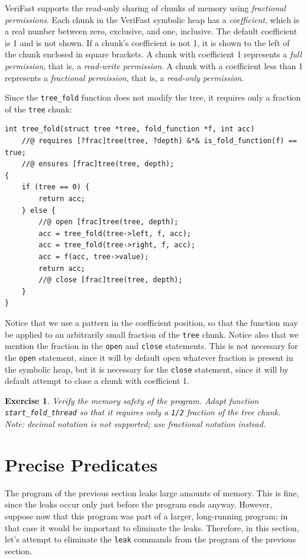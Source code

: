 \documentclass{article}
\newtheorem{exercise}{Exercise}
\begin{document}
VeriFast supports the read-only sharing of chunks of memory
using \emph{fractional permissions}. Each chunk in the VeriFast
symbolic heap has a \emph{coefficient}, which is a real number
between zero, exclusive, and one, inclusive. The default
coefficient is 1 and is not shown. If a chunk's coefficient is
not 1, it is shown to the left of the chunk enclosed in square
brackets. A chunk with coefficient 1 represents a \emph{full
permission}, that is, a \emph{read-write permission}. A chunk
with a coefficient less than 1 represents a \emph{fractional
permission}, that is, a \emph{read-only permission}.

Since the \lstinline!tree_fold! function does not modify the
tree, it requires only a fraction of the \lstinline!tree!
chunk:
\begin{lstlisting}
int tree_fold(struct tree *tree, fold_function *f, int acc)
    //@ requires [?frac]tree(tree, ?depth) &*& is_fold_function(f) == true;
    //@ ensures [frac]tree(tree, depth);
{
    if (tree == 0) {
        return acc;
    } else {
        //@ open [frac]tree(tree, depth);
        acc = tree_fold(tree->left, f, acc);
        acc = tree_fold(tree->right, f, acc);
        acc = f(acc, tree->value);
        return acc;
        //@ close [frac]tree(tree, depth);
    }
}
\end{lstlisting}
Notice that we use a pattern in the coefficient position, so
that the function may be applied to an arbitrarily small
fraction of the \lstinline!tree! chunk. Notice also that we
mention the fraction in the \lstinline!open! and
\lstinline!close! statements. This is not necessary for the
\lstinline!open! statement, since it will by default open
whatever fraction is present in the symbolic heap, but it is
necessary for the \lstinline!close! statement, since it will by
default attempt to close a chunk with coefficient 1.

\begin{exercise}\label{exercise:fractions}
Verify the memory safety of the program. Adapt function
\lstinline!start_fold_thread! so that it requires only a
\lstinline!1/2! fraction of the tree chunk. Note: decimal
notation is not supported; use fractional notation instead.
\end{exercise}

\section{Precise Predicates}\label{section:precise}

The program of the previous section leaks large amounts of
memory. This is fine, since the leaks occur only just before
the program ends anyway. However, suppose now that this program
was part of a larger, long-running program; in that case it
would be important to eliminate the leaks. Therefore, in this
section, let's attempt to eliminate the \lstinline|leak|
commands from the program of the previous section.
\end{document}
